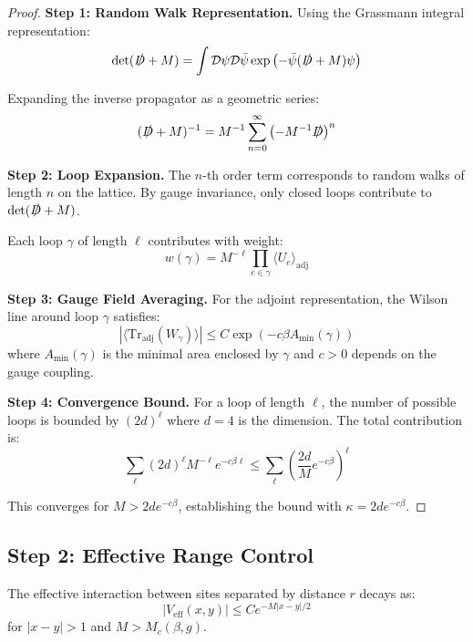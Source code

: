 \begin{proof}
\textbf{Step 1: Random Walk Representation.}
Using the Grassmann integral representation:
\begin{equation}
\det(\slashed{D} + M) = \int \mathcal{D}\psi \mathcal{D}\bar{\psi} \exp\left(-\bar{\psi}(\slashed{D} + M)\psi\right)
\end{equation}

Expanding the inverse propagator as a geometric series:
\begin{equation}
(\slashed{D} + M)^{-1} = M^{-1} \sum_{n=0}^{\infty} \left(-M^{-1}\slashed{D}\right)^n
\end{equation}

\textbf{Step 2: Loop Expansion.}
The $n$-th order term corresponds to random walks of length $n$ on the lattice. 
By gauge invariance, only closed loops contribute to $\det(\slashed{D} + M)$.

Each loop $\gamma$ of length $\ell$ contributes with weight:
\begin{equation}
w(\gamma) = M^{-\ell} \prod_{e \in \gamma} \langle U_e \rangle_{\text{adj}}
\end{equation}

\textbf{Step 3: Gauge Field Averaging.}
For the adjoint representation, the Wilson line around loop $\gamma$ satisfies:
\begin{equation}
|\langle \text{Tr}_{\text{adj}}(W_{\gamma}) \rangle| \leq C \exp(-c \beta A_{\min}(\gamma))
\end{equation}
where $A_{\min}(\gamma)$ is the minimal area enclosed by $\gamma$ and $c > 0$ depends on the gauge coupling.

\textbf{Step 4: Convergence Bound.}
For a loop of length $\ell$, the number of possible loops is bounded by $(2d)^\ell$ where $d=4$ is the dimension. The total contribution is:
\begin{equation}
\sum_{\ell} (2d)^\ell M^{-\ell} e^{-c\beta\ell} \leq \sum_{\ell} \left(\frac{2d}{M} e^{-c\beta}\right)^\ell
\end{equation}

This converges for $M > 2d e^{-c\beta}$, establishing the bound with $\kappa = 2d e^{-c\beta}$.
\end{proof}

\subsection{Step 2: Effective Range Control}

\begin{theorem}
\label{thm:exponential_decay}
The effective interaction between sites separated by distance $r$ decays as:
\begin{equation}
|V_{\text{eff}}(x, y)| \leq C e^{-M|x-y|/2}
\end{equation}
for $|x-y| > 1$ and $M > M_c(\beta, g)$.
\end{theorem}

